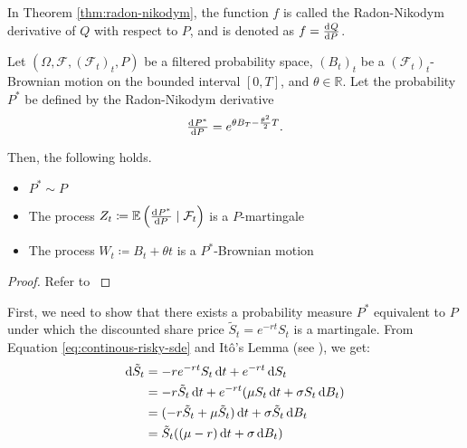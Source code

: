 \begin{dfn}
	\label{dfn:radon-nikodym-derivative}
	In Theorem \ref{thm:radon-nikodym}, the function $ f $ is called the Radon-Nikodym derivative of $ Q $ with respect to $ P $, and is denoted as $ f = \od{Q}{P} $.
\end{dfn}


\begin{thm}[Girsanov]
	\label{thm:continuous-girsanov}
	Let $ (\Omega, \mathcal{F}, (\mathcal{F}_t)_t, P) $ be a filtered probability space, $ (B_t)_t $ be a $ (\mathcal{F}_t)_t $-Brownian motion on the bounded interval $ [0, T] $, and $ \theta \in \mathbb{R} $. Let the probability $ P^* $ be defined by the Radon-Nikodym derivative
	\begin{equation}
	\od{P^*}{P} = e^{ \theta B_T - \frac{\theta^2}{2} T }.
	\end{equation}
	
	Then, the following holds.
	\begin{itemize}
		\item $ P^* \sim P $
		\item The process $ Z_t \coloneqq \E \left( \od{P^*}{P} \mid \mathcal{F}_t \right) $ is a $ P $-martingale
		\item The process $ W_t \coloneqq B_t + \theta t $ is a $ P^* $-Brownian motion
	\end{itemize}
\end{thm}

\begin{proof}
	Refer to \cite[Theorem 4.2.2 and Chapter 4: Exercise 19]{Lamberton1996}
\end{proof}


First, we need to show that there exists a probability measure $ P^* $ equivalent to $ P $ under which the discounted share price $ \tilde{S}_t = e^{-rt} S_t $ is a martingale. From Equation \ref{eq:continous-risky-sde} and Itô's Lemma (see \cite[Theorem 4.1.2]{Oksendal2003stochastic}), we get:
\begin{align*}
	\dif \tilde{S}_t  &=  -r e^{-rt} S_t \dif t + e^{-rt} \dif S_t  \\
	&=  -r \tilde{S}_t \dif t + e^{-rt} ( \mu S_t \dif t + \sigma S_t \dif B_t )  \\
	&=  (-r \tilde{S}_t + \mu \tilde{S}_t) \dif t + \sigma \tilde{S}_t \dif B_t  \\
	&=  \tilde{S}_t ( (\mu - r) \dif t + \sigma \dif B_t )
\end{align*}

